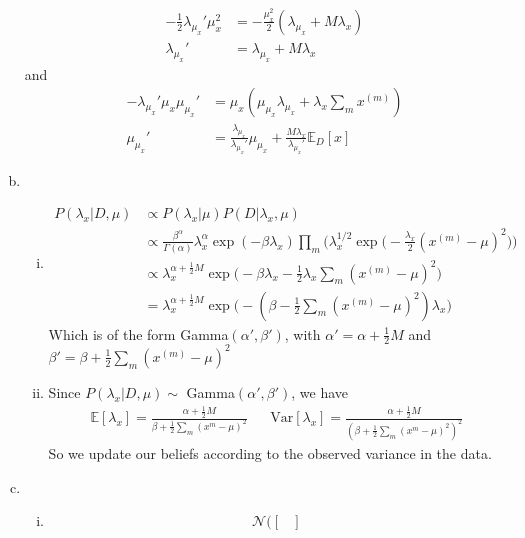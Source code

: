 \documentclass{article}
\begin{document}
\begin{enumerate}[(a)]
\begin{align*}
        -\frac{1}{2}\lambda_{\mu_x}'\mu_x^2 &= - \frac{\mu_x^2}{2}(\lambda_{\mu_x} + M\lambda_x) \\
        \lambda_{\mu_x}' &= \lambda_{\mu_x} + M\lambda_x
    \end{align*} and 
    \begin{align*}
        - \lambda_{\mu_x}' \mu_x \mu_{\mu_x}' &= \mu_x (\mu_{\mu_x}\lambda_{\mu_x} + \lambda_x\sum_m x^{(m)})\\
        \mu_{\mu_x}' &= \frac{\lambda_{\mu_x}}{\lambda_{\mu_x}'}\mu_{\mu_x} + \frac{M\lambda_x}{\lambda_{\mu_x}'}\mathbb{E}_D[x]
    \end{align*}
    \item \begin{enumerate}[(i)]
        \item \begin{align*}
            P(\lambda_x | D, \mu) &\propto P(\lambda_x|\mu)P(D|\lambda_x, \mu) \\
            &\propto \frac{\beta^{\alpha}}{\Gamma(\alpha)}\lambda_x^{\alpha}\exp(-\beta\lambda_x) \prod_m \biggl(\lambda_x^{1/2}\exp\bigg(-\frac{\lambda_x}{2}(x^{(m)} - \mu)^2\bigg)\biggr) \\ 
            &\propto \lambda_x^{\alpha + \frac{1}{2}M}\exp\biggl(-\beta\lambda_x - \frac{1}{2}\lambda_x\sum_m(x^{(m)} - \mu)^2\biggr) \\
            &= \lambda_x^{\alpha + \frac{1}{2}M}\exp\biggl(-(\beta - \frac{1}{2}\sum_m(x^{(m)} - \mu)^2)\lambda_x\biggr) 
        \end{align*}
        Which is of the form Gamma$(\alpha', \beta')$, with $\alpha' = \alpha + \frac{1}{2}M$ and $\beta' = \beta + \frac{1}{2}\sum_{m}(x^{(m)} - \mu)^2$
        \item Since $P(\lambda_x | D, \mu) \sim $ Gamma$(\alpha', \beta')$, we have
        \begin{align*}
            \mathbb{E}[\lambda_x] = \frac{\alpha + \frac{1}{2}M}{\beta + \frac{1}{2}\sum_m(x^m - \mu)^2} & & \text{Var}[\lambda_x] = \frac{\alpha + \frac{1}{2}M}{(\beta + \frac{1}{2}\sum_m(x^m - \mu)^2)^2}
        \end{align*}
        So we update our beliefs according to the observed variance in the data. 
    \end{enumerate}
    \item
    \begin{enumerate}[(i)]
    \item \begin{align*}
        \mathcal{N}\biggl(\begin{bmatrix}

\end{bmatrix}
\end{align*}
\end{enumerate}
\end{enumerate}
\end{document}
